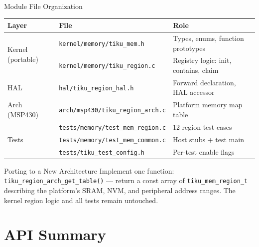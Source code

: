 \documentclass[aspectratio=169, 10pt]{beamer}
\begin{document}
\begin{frame}[fragile]{Module File Organization}
\begin{table}
\centering
\small
\begin{tabular}{@{}lll@{}}
\toprule
\textbf{Layer} & \textbf{File} & \textbf{Role} \\
\midrule
\multirow{2}{*}{Kernel (portable)}
  & \texttt{kernel/memory/tiku\_mem.h}    & Types, enums, function prototypes \\
  & \texttt{kernel/memory/tiku\_region.c} & Registry logic: init, contains, claim \\
\midrule
\multirow{1}{*}{HAL}
  & \texttt{hal/tiku\_region\_hal.h} & Forward declaration, HAL accessor \\
\midrule
\multirow{1}{*}{Arch (MSP430)}
  & \texttt{arch/msp430/tiku\_region\_arch.c} & Platform memory map table \\
\midrule
\multirow{3}{*}{Tests}
  & \texttt{tests/memory/test\_mem\_region.c}  & 12 region test cases \\
  & \texttt{tests/memory/test\_mem\_common.c}  & Host stubs + test main \\
  & \texttt{tests/tiku\_test\_config.h}        & Per-test enable flags \\
\bottomrule
\end{tabular}
\end{table}

\vspace{0.5em}
\begin{block}{Porting to a New Architecture}
Implement one function:
\texttt{tiku\_region\_arch\_get\_table()} --- return a const
array of \texttt{tiku\_mem\_region\_t} describing the platform's
SRAM, NVM, and peripheral address ranges.  The kernel region
logic and all tests remain untouched.
\end{block}
\end{frame}

\section{API Summary}
\end{document}
